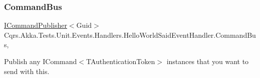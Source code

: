 \subsubsection{\texorpdfstring{Command\+Bus}{CommandBus}}
{\footnotesize\ttfamily \hyperlink{interfaceCqrs_1_1Commands_1_1ICommandPublisher}{I\+Command\+Publisher}$<$Guid$>$ Cqrs.\+Akka.\+Tests.\+Unit.\+Events.\+Handlers.\+Hello\+World\+Said\+Event\+Handler.\+Command\+Bus\hspace{0.3cm}{\ttfamily [get]}, {\ttfamily [protected]}}



Publish any I\+Command$<$\+T\+Authentication\+Token$>$ instances that you want to send with this. 

